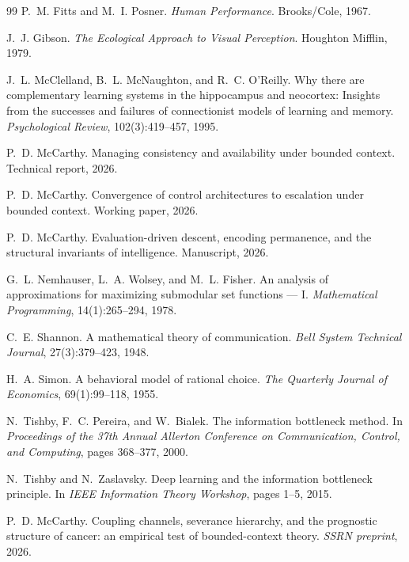 \documentclass[11pt]{article}
\theoremstyle{definition}
\theoremstyle{remark}
\begin{document}
\begin{thebibliography}{99}
P.~M. Fitts and M.~I. Posner.
\newblock \emph{Human Performance}.
\newblock Brooks/Cole, 1967.

J.~J. Gibson.
\newblock \emph{The Ecological Approach to Visual Perception}.
\newblock Houghton Mifflin, 1979.

J.~L. McClelland, B.~L. McNaughton, and R.~C. O'Reilly.
\newblock Why there are complementary learning systems in the hippocampus and
  neocortex: Insights from the successes and failures of connectionist models
  of learning and memory.
\newblock \emph{Psychological Review}, 102(3):419--457, 1995.

P.~D. McCarthy.
\newblock Managing consistency and availability under bounded context.
\newblock Technical report, 2026.

P.~D. McCarthy.
\newblock Convergence of control architectures to escalation under bounded context.
\newblock Working paper, 2026.

P.~D. McCarthy.
\newblock Evaluation-driven descent, encoding permanence, and the structural
  invariants of intelligence.
\newblock Manuscript, 2026.

G.~L. Nemhauser, L.~A. Wolsey, and M.~L. Fisher.
\newblock An analysis of approximations for maximizing submodular set
  functions --- {I}.
\newblock \emph{Mathematical Programming}, 14(1):265--294, 1978.

C.~E. Shannon.
\newblock A mathematical theory of communication.
\newblock \emph{Bell System Technical Journal}, 27(3):379--423, 1948.

H.~A. Simon.
\newblock A behavioral model of rational choice.
\newblock \emph{The Quarterly Journal of Economics}, 69(1):99--118, 1955.

N.~Tishby, F.~C. Pereira, and W.~Bialek.
\newblock The information bottleneck method.
\newblock In \emph{Proceedings of the 37th Annual Allerton Conference on
  Communication, Control, and Computing}, pages 368--377, 2000.

N.~Tishby and N.~Zaslavsky.
\newblock Deep learning and the information bottleneck principle.
\newblock In \emph{IEEE Information Theory Workshop}, pages 1--5, 2015.

P.~D. McCarthy.
\newblock Coupling channels, severance hierarchy, and the prognostic
structure of cancer: an empirical test of bounded-context theory.
\newblock \emph{SSRN preprint}, 2026.

\end{thebibliography}
\end{document}
